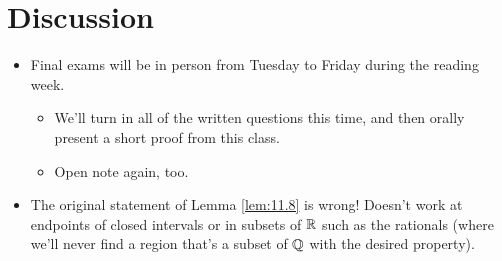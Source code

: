 \documentclass{report}
\begin{document}



\section{Discussion}
\begin{itemize}
    \item Final exams will be in person from Tuesday to Friday during the reading week.
    \begin{itemize}
        \item We'll turn in all of the written questions this time, and then orally present a short proof from this class.
        \item Open note again, too.
    \end{itemize}
    \item The original statement of Lemma \ref{lem:11.8} is wrong! Doesn't work at endpoints of closed intervals or in subsets of $\mathbb{R}$ such as the rationals (where we'll never find a region that's a subset of $\mathbb{Q}$ with the desired property).
\end{itemize}
\end{document}
